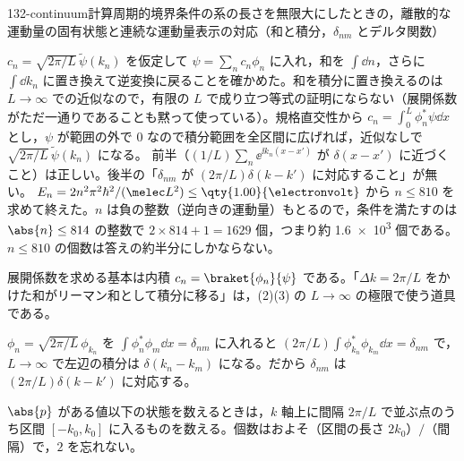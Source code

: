 \documentclass[uplatex,dvipdfmx,a4paper,11pt]{jsarticle}
\begin{document}
\begin{mondai}{132-continuum}{計算}{周期的境界条件の系の長さを無限大にしたときの，離散的な運動量の固有状態と連続な運動量表示の対応（和と積分，$\delta_{nm}$ とデルタ関数）}
\begin{kotaeran}
   $c_{n}=\sqrt{2\pi/L}\,\tilde{\psi}(k_{n})$ を仮定して $\psi=\sum_{n}c_{n}\phi_{n}$ に入れ，和を $\int\dd n$，さらに $\int\dd k_{n}$ に置き換えて逆変換に戻ることを確かめた。和を積分に置き換えるのは $L\to\infty$ での近似なので，有限の $L$ で成り立つ等式の証明にならない（展開係数がただ一通りであることも黙って使っている）。規格直交性から $c_{n}=\int_{0}^{L}\phi_{n}^{*}\psi\dd x$ とし，$\psi$ が範囲の外で $0$ なので積分範囲を全区間に広げれば，近似なしで $\sqrt{2\pi/L}\,\tilde{\psi}(k_{n})$ になる。
   前半（$(1/L)\sum_{n}\ee^{\ii k_{n}(x-x')}$ が $\delta(x-x')$ に近づくこと）は正しい。後半の「$\delta_{nm}$ が $(2\pi/L)\delta(k-k')$ に対応すること」が無い。
   $E_{n}=2n^{2}\pi^{2}\hbar^{2}/(\melec L^{2})\le\qty{1.00}{\electronvolt}$ から $n\le810$ を求めて終えた。$n$ は負の整数（逆向きの運動量）もとるので，条件を満たすのは $\abs{n}\le814$ の整数で $2\times814+1=1629$ 個，つまり約 \num{1.6e3} 個である。$n\le810$ の個数は答えの約半分にしかならない。
\end{kotaeran}
\begin{rikai}
  \item 展開係数を求める基本は内積 $c_{n}=\braket{\phi_{n}}{\psi}$ である。「$\Delta k=2\pi/L$ をかけた和がリーマン和として積分に移る」は，(2)(3) の $L\to\infty$ の極限で使う道具である。
  \item $\phi_{n}=\sqrt{2\pi/L}\,\phi_{k_{n}}$ を $\int\phi_{n}^{*}\phi_{m}\dd x=\delta_{nm}$ に入れると $(2\pi/L)\int\phi_{k_{n}}^{*}\phi_{k_{m}}\dd x=\delta_{nm}$ で，$L\to\infty$ で左辺の積分は $\delta(k_{n}-k_{m})$ になる。だから $\delta_{nm}$ は $(2\pi/L)\delta(k-k')$ に対応する。
  \item $\abs{p}$ がある値以下の状態を数えるときは，$k$ 軸上に間隔 $2\pi/L$ で並ぶ点のうち区間 $[-k_{0},k_{0}]$ に入るものを数える。個数はおよそ（区間の長さ $2k_{0}$）$/$（間隔）で，$2$ を忘れない。
\end{rikai}
\end{mondai}
\end{document}
